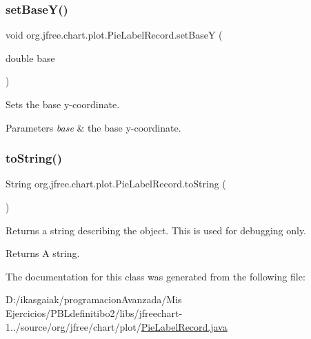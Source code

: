 \subsubsection{\texorpdfstring{set\+Base\+Y()}{setBaseY()}}
{\footnotesize\ttfamily void org.\+jfree.\+chart.\+plot.\+Pie\+Label\+Record.\+set\+BaseY (\begin{DoxyParamCaption}\item[{double}]{base }\end{DoxyParamCaption})}

Sets the base y-\/coordinate.


\begin{DoxyParams}{Parameters}
{\em base} & the base y-\/coordinate. \\
\hline
\end{DoxyParams}
\mbox{\label{classorg_1_1jfree_1_1chart_1_1plot_1_1_pie_label_record_a38f9bb3c4a1d20119cfb9704e58d4781}} 
\subsubsection{\texorpdfstring{to\+String()}{toString()}}
{\footnotesize\ttfamily String org.\+jfree.\+chart.\+plot.\+Pie\+Label\+Record.\+to\+String (\begin{DoxyParamCaption}{ }\end{DoxyParamCaption})}

Returns a string describing the object. This is used for debugging only.

\begin{DoxyReturn}{Returns}
A string. 
\end{DoxyReturn}


The documentation for this class was generated from the following file\+:\begin{DoxyCompactItemize}
\item 
D\+:/ikasgaiak/programacion\+Avanzada/\+Mis Ejercicios/\+P\+B\+Ldefinitibo2/libs/jfreechart-\/1../source/org/jfree/chart/plot/\mbox{\hyperlink{_pie_label_record_8java}{Pie\+Label\+Record.\+java}}\end{DoxyCompactItemize}
